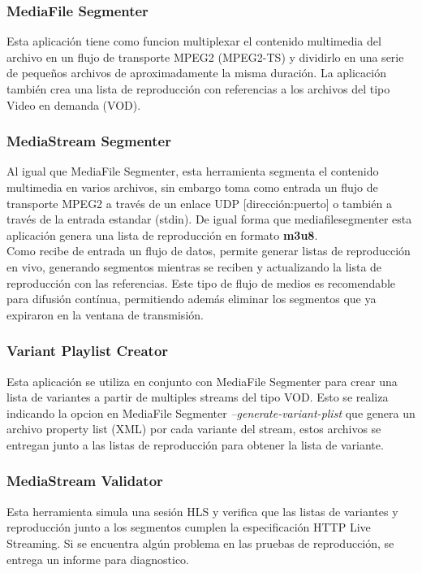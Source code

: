 		\subsubsection{MediaFile Segmenter}
Esta aplicación tiene como funcion multiplexar el contenido multimedia del archivo en un flujo de transporte MPEG2 (MPEG2-TS) y dividirlo en una serie de pequeños archivos de aproximadamente la misma duración. La aplicación también crea una lista de reproducción con referencias a los archivos del tipo Video en demanda (VOD).

		\subsubsection{MediaStream Segmenter}
Al igual que MediaFile Segmenter, esta herramienta segmenta el contenido multimedia en varios archivos, sin embargo toma como entrada un flujo de transporte MPEG2 a través de un enlace UDP [dirección:puerto] o también a través de la entrada estandar (stdin). De igual forma que mediafilesegmenter esta aplicación genera una lista de reproducción en formato \textbf{m3u8}.\\

Como recibe de entrada un flujo de datos, permite generar listas de reproducción en vivo, generando segmentos mientras se reciben y actualizando la lista de reproducción con las referencias. Este tipo de flujo de medios es recomendable para difusión contínua, permitiendo además eliminar los segmentos que ya expiraron en la ventana de transmisión.

		\subsubsection{Variant Playlist Creator}
		Esta aplicación se utiliza en conjunto con MediaFile Segmenter para crear una lista de variantes a partir de multiples streams del tipo VOD. Esto se realiza indicando la opcion en MediaFile Segmenter \textit{--generate-variant-plist} que genera un archivo property list (XML) por cada variante del stream, estos archivos se entregan junto a las listas de reproducción para obtener la lista de variante.
			
		\subsubsection{MediaStream Validator}		
		Esta herramienta simula una sesión HLS y verifica que las listas de variantes y reproducción junto a los segmentos cumplen la especificación HTTP Live Streaming. Si se encuentra algún problema en las pruebas de reproducción, se entrega un informe para diagnostico.
		
